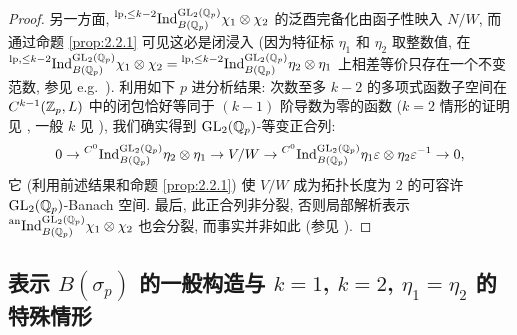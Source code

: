 \begin{proof}
另一方面, $\prescript{\mathrm{lp},\le k-2}{}{\mathrm{Ind}}_{B(\mathbb{Q}_p)}^{\mathrm{GL}_2(\mathbb{Q}_p)} \chi_1 \otimes \chi_2$ 的泛酉完备化由函子性映入 $N/W$, 而通过命题 \ref{prop:2.2.1} 可见这必是闭浸入 (因为特征标 $\eta_1$ 和 $\eta_2$ 取整数值, 在 $\prescript{\mathrm{lp},\le k-2}{}{\mathrm{Ind}}_{B(\mathbb{Q}_p)}^{\mathrm{GL}_2(\mathbb{Q}_p)} \chi_1 \otimes \chi_2 = \prescript{\mathrm{lp},\le k-2}{}{\mathrm{Ind}}_{B(\mathbb{Q}_p)}^{\mathrm{GL}_2(\mathbb{Q}_p)} \eta_2 \otimes \eta_1$ 上相差等价只存在一个不变范数, 参见 e.g.\ \cite[Cor.~5.4.4]{ref:3}).
利用如下 $p$ 进分析结果: 次数至多 $k-2$ 的多项式函数子空间在 $C^{k-1}(\mathbb{Z}_p,L)$ 中的闭包恰好等同于 $(k-1)$ 阶导数为零的函数 ($k = 2$ 情形的证明见 \cite[\S68]{ref:42}, 一般 $k$ 见 \cite[\S8]{ref:41}), 我们确实得到 $\mathrm{GL}_2(\mathbb{Q}_p)$-等变正合列:
\[
0 \to \prescript{C^{0}}{}{\mathrm{Ind}}_{B(\mathbb{Q}_p)}^{\mathrm{GL}_2(\mathbb{Q}_p)} \eta_2 \otimes \eta_1 \to V/W \to \prescript{C^{0}}{}{\mathrm{Ind}}_{B(\mathbb{Q}_p)}^{\mathrm{GL}_2(\mathbb{Q}_p)} \eta_1\varepsilon \otimes \eta_2\varepsilon^{-1} \to 0,
\]
它 (利用前述结果和命题 \ref{prop:2.2.1}) 使 $V/W$ 成为拓扑长度为 $2$ 的可容许 $\mathrm{GL}_2(\mathbb{Q}_p)$-Banach 空间.
最后, 此正合列非分裂, 否则局部解析表示 $\prescript{\mathrm{an}}{}{\mathrm{Ind}}_{B(\mathbb{Q}_p)}^{\mathrm{GL}_2(\mathbb{Q}_p)} \chi_1 \otimes \chi_2$ 也会分裂, 而事实并非如此 (参见 \cite{ref:44}).
\end{proof}

\subsection{表示 $B(\sigma_p)$ 的一般构造与 $k = 1$, $k = 2$, $\eta_1 = \eta_2$ 的特殊情形}\label{sec:2.3}

